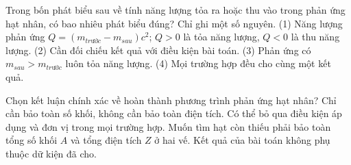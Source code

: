 \begin{ex}
Trong bốn phát biểu sau về tính năng lượng tỏa ra hoặc thu vào trong phản ứng hạt nhân, có bao nhiêu phát biểu đúng? Chỉ ghi một số nguyên. (1) Năng lượng phản ứng $Q=(m_{trước}-m_{sau})c^2$; $Q>0$ là tỏa năng lượng, $Q<0$ là thu năng lượng. (2) Cần đối chiếu kết quả với điều kiện bài toán. (3) Phản ứng có $m_{sau}\gt m_{trước}$ luôn tỏa năng lượng. (4) Mọi trường hợp đều cho cùng một kết quả.
\end{ex}

\begin{ex}
Chọn kết luận chính xác về hoàn thành phương trình phản ứng hạt nhân?
\choice
{Chỉ cần bảo toàn số khối, không cần bảo toàn điện tích.}
{Có thể bỏ qua điều kiện áp dụng và đơn vị trong mọi trường hợp.}
{\True Muốn tìm hạt còn thiếu phải bảo toàn tổng số khối $A$ và tổng điện tích $Z$ ở hai vế.}
{Kết quả của bài toán không phụ thuộc dữ kiện đã cho.}
\end{ex}

